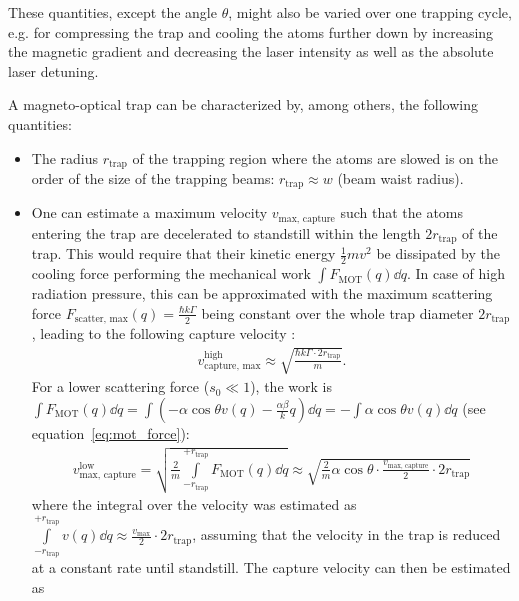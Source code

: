 These quantities, except the angle $\theta$, might also be varied over one trapping cycle, e.g. for compressing the trap and cooling the atoms further down by increasing the magnetic gradient and decreasing the laser intensity as well as the absolute laser detuning.

A magneto-optical trap can be characterized by, among others, the following quantities:
\begin{itemize}
    \item The radius $r_\text{trap}$ of the trapping region where the atoms are slowed  is on the order of the size of the trapping beams: $r_\text{trap} \approx w$ (beam waist radius).
    \item One can estimate a maximum velocity $v_\text{max, capture}$ such that the atoms entering the trap are decelerated to standstill within the length $2r_\text{trap}$ of the trap. This would require that their kinetic energy $\frac{1}{2}mv^2$ be dissipated by the cooling force performing the mechanical work $\int F_\text{MOT}(q) \dd{q}$. In case of high radiation pressure, this can be approximated with the maximum scattering force $F_\text{scatter, max}(q) = \frac{\hbar k \Gamma}{2}$ being constant over the whole trap diameter $2 r_\text{trap}$, leading to the following capture velocity \cite{lunden_enhancing_2020}:
    \begin{align}\label{eq:capture_velocity_high}
        v_\text{capture, max}^\text{high} \approx \sqrt{\frac{\hbar k \Gamma \cdot 2 r_\text{trap}}{m}}.
    \end{align}
     For a lower scattering force ($s_0 \ll 1$), the work is $\int F_\text{MOT}(q)\dd{q}= \int (-\alpha \cos \theta v(q) - \frac{\alpha\beta}{k}q) \dd{q} = - \int \alpha \cos \theta v(q) \dd{q}$ (see equation~\ref{eq:mot_force}):
    \begin{align}
            v_\text{max, capture}^\text{low}
            = \sqrt{\frac{2}{m} \int\limits_{-r_\text{trap}}^{+r_\text{trap}} F_\text{MOT}(q) \dd{q}} 
            \approx \sqrt{\frac{2}{m} \alpha \cos \theta \cdot \frac{v_\text{max, capture}}{2} \cdot 2r_\text{trap}}
    \end{align}
    where the integral over the velocity was estimated as $\int\limits_{-r_\text{trap}}^{+r_\text{trap}}  v(q) \dd{q} \approx \frac{v_\text{max}}{2} \cdot 2r_\text{trap}$, assuming that the velocity in the trap is reduced at a constant rate until standstill. The capture velocity can then be estimated as
    \begin{align}\label{eq:capture_velocity_low}

\end{align}
\end{itemize}
